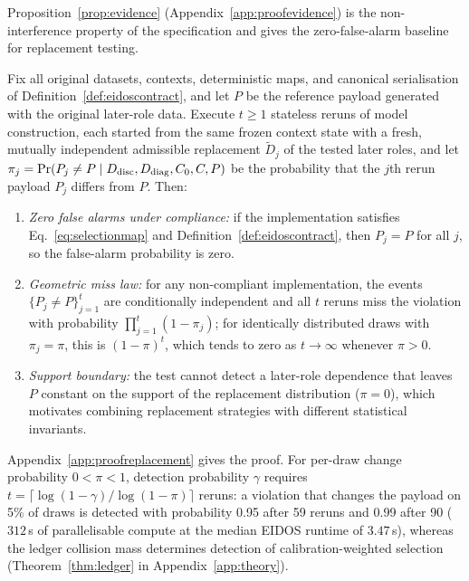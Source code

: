 Proposition~\ref{prop:evidence} (Appendix~\ref{app:proofevidence}) is the non-interference property of the specification and gives the zero-false-alarm baseline for replacement testing.

\begin{proposition}\label{prop:replacementpower}
Fix all original datasets, contexts, deterministic maps, and canonical serialisation of Definition~\ref{def:eidoscontract}, and let \(P\) be the reference payload generated with the original later-role data. Execute \(t\ge1\) stateless reruns of model construction, each started from the same frozen context state with a fresh, mutually independent admissible replacement \(\widetilde D_j\) of the tested later roles, and let \(\pi_j=\Pr(P_j\neq P\mid D_{\rm disc},D_{\rm diag},C_0,C,P)\) be the probability that the \(j\)th rerun payload \(P_j\) differs from \(P\). Then:
\begin{enumerate}
\item[(i)] \emph{Zero false alarms under compliance:} if the implementation satisfies Eq.~\eqref{eq:selectionmap} and Definition~\ref{def:eidoscontract}, then \(P_j=P\) for all \(j\), so the false-alarm probability is zero.
\item[(ii)] \emph{Geometric miss law:} for any non-compliant implementation, the events \(\{P_j\neq P\}_{j=1}^t\) are conditionally independent and all \(t\) reruns miss the violation with probability \(\prod_{j=1}^{t}(1-\pi_j)\); for identically distributed draws with \(\pi_j=\pi\), this is \((1-\pi)^t\), which tends to zero as \(t\to\infty\) whenever \(\pi>0\).
\item[(iii)] \emph{Support boundary:} the test cannot detect a later-role dependence that leaves \(P\) constant on the support of the replacement distribution (\(\pi=0\)), which motivates combining replacement strategies with different statistical invariants.
\end{enumerate}
\end{proposition}

Appendix~\ref{app:proofreplacement} gives the proof. For per-draw change probability \(0<\pi<1\), detection probability \(\gamma\) requires \(t=\lceil\log(1-\gamma)/\log(1-\pi)\rceil\) reruns: a violation that changes the payload on 5\% of draws is detected with probability 0.95 after 59 reruns and 0.99 after 90 (\(312\)\,s of parallelisable compute at the median EIDOS runtime of \(3.47\)\,s), whereas the ledger collision mass determines detection of calibration-weighted selection (Theorem~\ref{thm:ledger} in Appendix~\ref{app:theory}).

